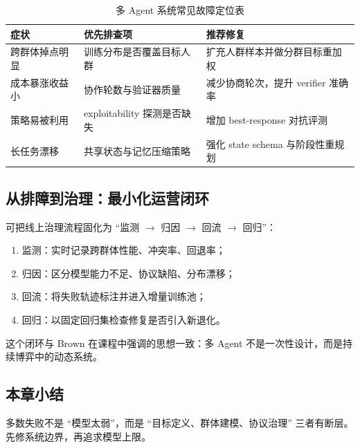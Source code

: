 \begin{table}[H]
\centering
\begin{tabular}{p{3.0cm}p{4.2cm}p{4.2cm}}
\toprule
\textbf{症状} & \textbf{优先排查项} & \textbf{推荐修复} \\
\midrule
跨群体掉点明显 & 训练分布是否覆盖目标人群 & 扩充人群样本并做分群目标重加权 \\
成本暴涨收益小 & 协作轮数与验证器质量 & 减少协商轮次，提升 verifier 准确率 \\
策略易被利用 & exploitability 探测是否缺失 & 增加 best-response 对抗评测 \\
长任务漂移 & 共享状态与记忆压缩策略 & 强化 state schema 与阶段性重规划 \\
\bottomrule
\end{tabular}
\caption{多 Agent 系统常见故障定位表}
\end{table}

\subsection{从排障到治理：最小化运营闭环}
可把线上治理流程固化为 ``监测 $\rightarrow$ 归因 $\rightarrow$ 回流 $\rightarrow$ 回归''：
\begin{enumerate}
    \item 监测：实时记录跨群体性能、冲突率、回退率；
    \item 归因：区分模型能力不足、协议缺陷、分布漂移；
    \item 回流：将失败轨迹标注并进入增量训练池；
    \item 回归：以固定回归集检查修复是否引入新退化。
\end{enumerate}

这个闭环与 Brown 在课程中强调的思想一致：多 Agent 不是一次性设计，而是持续博弈中的动态系统。

\subsection{本章小结}
多数失败不是 ``模型太弱''，而是 ``目标定义、群体建模、协议治理'' 三者有断层。先修系统边界，再追求模型上限。

